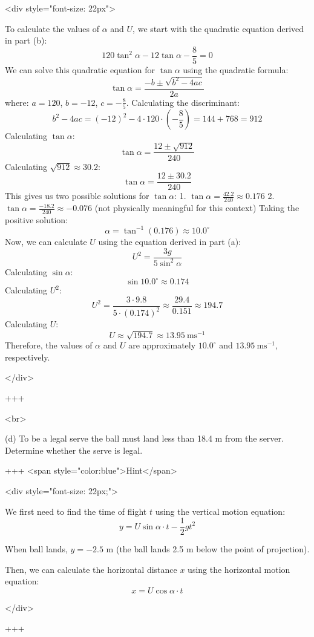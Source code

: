 <div style="font-size: 22px">

To calculate the values of \( \alpha \) and \( U \), we start with the quadratic equation derived in part (b):
$$ 120 \tan^{2} \alpha - 12 \tan \alpha - \frac{8}{5} = 0 $$
We can solve this quadratic equation for \( \tan \alpha \) using the quadratic formula:
$$ \tan \alpha = \frac{-b \pm \sqrt{b^2 - 4ac}}{2a} $$
where:
\( a = 120 \),
\( b = -12 \),
\( c = -\frac{8}{5} \).
Calculating the discriminant:
$$ b^2 - 4ac = (-12)^2 - 4 \cdot 120 \cdot \left(-\frac{8}{5}\right) = 144 + 768 = 912 $$
Calculating \( \tan \alpha \):
$$ \tan \alpha = \frac{12 \pm \sqrt{912}}{240} $$
Calculating \( \sqrt{912} \approx 30.2 \):
$$ \tan \alpha = \frac{12 \pm 30.2}{240} $$
This gives us two possible solutions for \( \tan \alpha \):
1. \( \tan \alpha = \frac{42.2}{240} \approx 0.176 \)
2. \( \tan \alpha = \frac{-18.2}{240} \approx -0.076 \) (not physically meaningful for this context)
Taking the positive solution:
$$ \alpha = \tan^{-1}(0.176) \approx 10.0^{\circ} $$
Now, we can calculate \( U \) using the equation derived in part (a):
$$ U^{2} = \frac{3g}{5 \sin^{2} \alpha} $$
Calculating \( \sin \alpha \):
$$ \sin 10.0^{\circ} \approx 0.174 $$
Calculating \( U^{2} \):
$$ U^{2} = \frac{3 \cdot 9.8}{5 \cdot (0.174)^{2}} \approx \frac{29.4}{0.151} \approx 194.7 $$
Calculating \( U \):
$$ U \approx \sqrt{194.7} \approx 13.95 \mathrm{~ms}^{-1} $$
Therefore, the values of \( \alpha \) and \( U \) are approximately \( 10.0^{\circ} \) and \( 13.95 \mathrm{~ms}^{-1} \), respectively.

</div>

+++

<br>

(d) To be a legal serve the ball must land less than 18.4 m from the server. Determine whether the serve is legal.

+++ <span style="color:blue">Hint</span>

<div style="font-size: 22px;">

We first need to find the time of flight \( t \) using the vertical motion equation:
$$ y = U \sin \alpha \cdot t - \frac{1}{2} g t^2 $$

When ball lands, \( y = -2.5 \) m (the ball lands 2.5 m below the point of projection).

Then, we can calculate the horizontal distance \( x \) using the horizontal motion equation:
$$ x = U \cos \alpha \cdot t $$

</div>

+++

